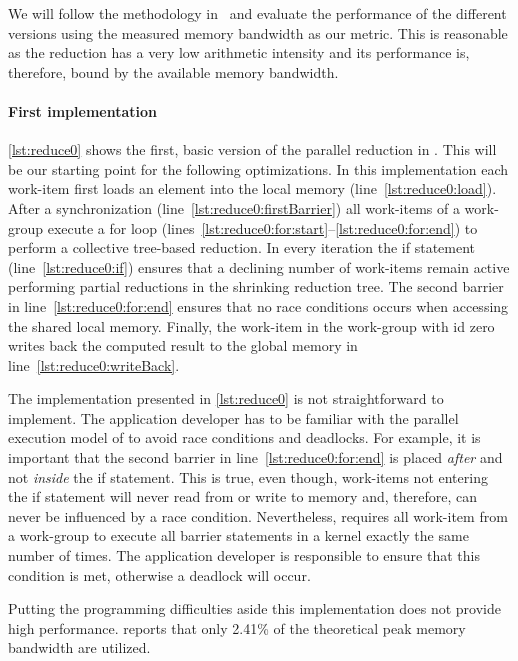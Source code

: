 We will follow the methodology in~\cite{Harris2007} and evaluate the performance of the different versions using the measured memory bandwidth as our metric.
This is reasonable as the reduction has a very low arithmetic intensity and its performance is, therefore, bound by the available memory bandwidth.

\paragraph{First \OpenCL implementation}
\autoref{lst:reduce0} shows the first, basic version of the parallel reduction in \OpenCL.
This will be our starting point for the following optimizations.
In this implementation each work-item first loads an element into the local memory (line~\ref{lst:reduce0:load}).
After a synchronization (line~\ref{lst:reduce0:firstBarrier}) all work-items of a work-group execute a for loop (lines~\ref{lst:reduce0:for:start}--\ref{lst:reduce0:for:end}) to perform a collective tree-based reduction.
In every iteration the if statement (line~\ref{lst:reduce0:if}) ensures that a declining number of work-items remain active performing partial reductions in the shrinking reduction tree.
The second barrier in line~\ref{lst:reduce0:for:end} ensures that no race conditions occurs when accessing the shared local memory.
Finally, the work-item in the work-group with id zero writes back the computed result to the global memory in line~\ref{lst:reduce0:writeBack}.

The implementation presented in \autoref{lst:reduce0} is not straightforward to implement.
The application developer has to be familiar with the parallel execution model of \OpenCL to avoid race conditions and deadlocks.
For example, it is important that the second barrier in line~\ref{lst:reduce0:for:end} is placed \emph{after} and not \emph{inside} the if statement.
This is true, even though, work-items not entering the if statement will never read from or write to memory and, therefore, can never be influenced by a race condition.
Nevertheless, \OpenCL requires all work-item from a work-group to execute all barrier statements in a kernel exactly the same number of times.
The application developer is responsible to ensure that this condition is met, otherwise a deadlock will occur.

Putting the programming difficulties aside this implementation does not provide high performance.
\citeauthor{Harris2007} reports that only 2.41\% of the theoretical peak memory bandwidth are utilized. 

